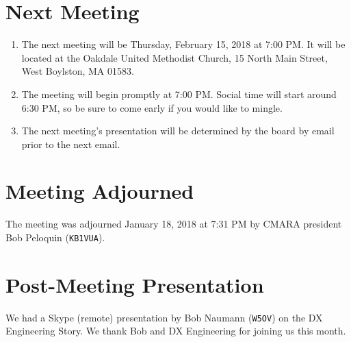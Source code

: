 \documentclass[10pt,letterpaper]{article}
\begin{document}
\section{Next Meeting}
\begin{enumerate}
  \item The next meeting will be Thursday, February 15, 2018 at 7:00 PM. It will be located at the Oakdale United Methodist Church, 15 North Main Street, West Boylston, MA 01583.
  \item The meeting will begin promptly at 7:00 PM. Social time will start around 6:30 PM, so be sure to come early if you would like to mingle.
  \item The next meeting's presentation will be determined by the board by email prior to the next email.
\end{enumerate}

\section{Meeting Adjourned}
The meeting was adjourned January 18, 2018 at 7:31 PM by CMARA president Bob Peloquin (\texttt{KB1VUA}).

\section{Post-Meeting Presentation}
We had a Skype (remote) presentation by Bob Naumann (\texttt{W5OV}) on the DX Engineering Story. We thank Bob and DX Engineering for joining us this month.
\end{document}
